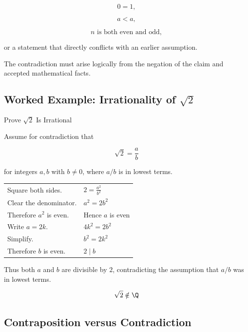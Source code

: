 \[ 0=1, \]

\[ a<a, \]

\[ n\text{ is both even and odd}, \]

or a statement that directly conflicts with an earlier assumption.

The contradiction must arise logically from the negation of the claim and
accepted mathematical facts.

\subsection{Worked Example: Irrationality of \(\sqrt2\)}
\label{subsec:worked-sqrt2-contradiction}

\begin{workedexamplebox}{Prove \(\sqrt2\) Is Irrational}

Assume for contradiction that

\[ \sqrt2=\frac ab \]

for integers \(a,b\) with \(b\neq0\), where \(a/b\) is in lowest terms.

\begin{tabularx}{\textwidth}{@{}>{\raggedright\arraybackslash}p{}X@{}}
Square both sides. & \(2=\frac{a^2}{b^2}\)\\
Clear the denominator. & \(a^2=2b^2\)\\
Therefore \(a^2\) is even. & Hence \(a\) is even\\
Write \(a=2k\). & \(4k^2=2b^2\)\\
Simplify. & \(b^2=2k^2\)\\
Therefore \(b\) is even. & \(2\mid b\)
\end{tabularx}

Thus both \(a\) and \(b\) are divisible by \(2\), contradicting the assumption
that \(a/b\) was in lowest terms.

\begin{answerbox}
\[ \sqrt2\notin\Q \]
\end{answerbox}
\end{workedexamplebox}

\subsection{Contraposition versus Contradiction}
\label{subsec:contraposition-vs-contradiction}

